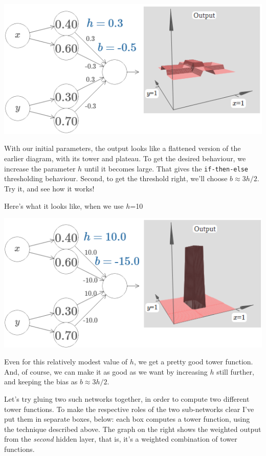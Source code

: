 {\centering \includegraphics[width=.8\textwidth,]{pic/wigglyfn34} \par}


With our initial parameters, the output looks like a flattened version of the earlier diagram, with its tower and plateau. To get the desired behaviour, we increase the parameter $h$  until it becomes large. That gives the \lstinline{if-then-else} thresholding behaviour. Second, to get the threshold right, we'll choose $b\approx 3h/2$. Try it, and see how it works!

Here's what it looks like, when we use $h$=10

{\centering \includegraphics[width=.8\textwidth,]{pic/wigglyfn35} \par}

Even for this relatively modest value of $h$, we get a pretty good tower function. And, of course, we can make it as good as we want by increasing $h$ still further, and keeping the bias as $b\approx 3h/2$.

Let's try gluing two such networks together, in order to compute two different tower functions. To make the respective roles of the two sub-networks clear I've put them in separate boxes, below: each box computes a tower function, using the technique described above. The graph on the right shows the weighted output from the \textit{second} hidden layer, that is, it's a weighted combination of tower functions.

